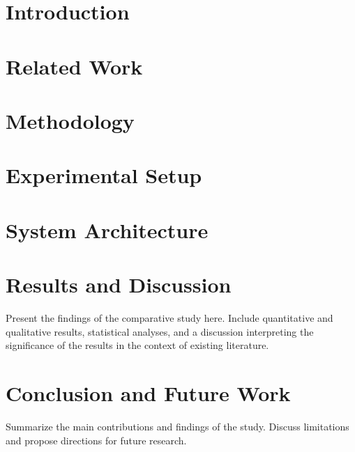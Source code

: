 \documentclass[11pt,twoside,openany]{book}
\begin{document}
\frontmatter
\pagestyle{plain} %






\newpage
\renewcommand{\contentsname}{Contents}
{\let\oldchapter\chapter
\renewcommand{\chapter}[1]{}
\tableofcontents
\renewcommand{\chapter}{\oldchapter}}


\mainmatter
\pagestyle{fancy} %

\chapter{Introduction}


\chapter{Related Work}


\chapter{Methodology}


\chapter{Experimental Setup}


\chapter{System Architecture}


\chapter{Results and Discussion}
Present the findings of the comparative study here. Include quantitative and qualitative results, statistical analyses, and a discussion interpreting the significance of the results in the context of existing literature.

\chapter{Conclusion and Future Work}
Summarize the main contributions and findings of the study. Discuss limitations and propose directions for future research.

\backmatter



\end{document}
